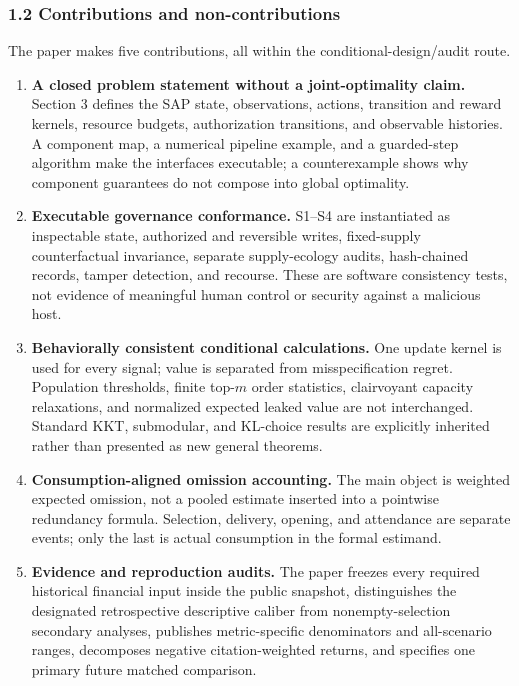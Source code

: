 \documentclass[
  11pt]{article}
\providecommand{\tightlist}{%
  \setlength{\itemsep}{0pt}\setlength{\parskip}{0pt}}
\begin{document}
\subsubsection{1.2 Contributions and
non-contributions}\label{contributions-and-non-contributions}

The paper makes five contributions, all within the
conditional-design/audit route.

\begin{enumerate}
\def\labelenumi{\arabic{enumi}.}
\tightlist
\item
  \textbf{A closed problem statement without a joint-optimality claim.}
  Section 3 defines the SAP state, observations, actions, transition and
  reward kernels, resource budgets, authorization transitions, and
  observable histories. A component map, a numerical pipeline example,
  and a guarded-step algorithm make the interfaces executable; a
  counterexample shows why component guarantees do not compose into
  global optimality.
\item
  \textbf{Executable governance conformance.} S1--S4 are instantiated as
  inspectable state, authorized and reversible writes, fixed-supply
  counterfactual invariance, separate supply-ecology audits,
  hash-chained records, tamper detection, and recourse. These are
  software consistency tests, not evidence of meaningful human control
  or security against a malicious host.
\item
  \textbf{Behaviorally consistent conditional calculations.} One update
  kernel is used for every signal; value is separated from
  misspecification regret. Population thresholds, finite top-\(m\) order
  statistics, clairvoyant capacity relaxations, and normalized expected
  leaked value are not interchanged. Standard KKT, submodular, and
  KL-choice results are explicitly inherited rather than presented as
  new general theorems.
\item
  \textbf{Consumption-aligned omission accounting.} The main object is
  weighted expected omission, not a pooled estimate inserted into a
  pointwise redundancy formula. Selection, delivery, opening, and
  attendance are separate events; only the last is actual consumption in
  the formal estimand.
\item
  \textbf{Evidence and reproduction audits.} The paper freezes every
  required historical financial input inside the public snapshot,
  distinguishes the designated retrospective descriptive caliber from
  nonempty-selection secondary analyses, publishes metric-specific
  denominators and all-scenario ranges, decomposes negative
  citation-weighted returns, and specifies one primary future matched
  comparison.
\end{enumerate}
\end{document}

